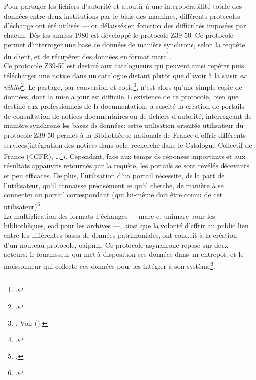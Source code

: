 Pour partager les fichiers d'autorité et aboutir à une interopérabilité totale des données entre deux institutions par le biais des machines, différents protocoles d'échange ont été utilisés --- ou délaissés en fonction des difficultés imposées par chacun. Dès les années 1980 est développé le protocole Z39-50. Ce protocole permet d'interroger une base de données de manière synchrone, selon la requête du client, et de récupérer des données en format \ac{marc}\footcite{bibliotheque_nationale_de_france_protocole_nodate}.\\

Ce protocole Z39-50 est destiné aux catalogueurs qui peuvent ainsi \og repérer puis télécharger une notice dans un catalogue distant plutôt que d’avoir à la saisir \textit{ex nihilo}\fg{}\footcite{bermes_convergence_2013}. Le partage, \og par conversion et copie\fg{}\footnote{\cite{bermes_convergence_2013}. Voir  ().}, n'est alors qu'une simple copie de données, dont la mise à jour est difficile. L'existence de ce protocole, bien que destiné aux professionnels de la documentation, a suscité la création de portails de consultation de notices documentaires ou de fichiers d'autorité, interrogeant de manière synchrone les bases de données: cette utilisation orientée utilisateur du protocole Z39-50 permet à la Bibliothèque nationale de France d'offrir différents services(intégration des notices dans \ac{oclc}, recherche dans le Catalogue Collectif de France (CCFR), \dots\footcite{bibliotheque_nationale_de_france_protocole_nodate}). Cependant, face aux temps de réponses importants et aux résultats appauvris retournés par la requête, les portails se sont révélés décevants et peu efficaces. De plus, l'utilisation d'un portail nécessite, de la part de l'utilisateur, qu'il connaisse précisément ce qu'il cherche, de manière à se connecter au portail correspondant (qui lui-même doit être connu de cet utilisateur)\footcite{dalbin_approches_2011}.\\

La multiplication des formats d'échanges --- \ac{marc} et \ac{unimarc} pour les bibliothèques, \ac{ead} pour les archives ---, ainsi que la volonté d'offrir au public lien entre les différentes bases de données patrimoniales, ont conduit à la création d'un nouveau protocole, \ac{oaipmh}. Ce protocole asynchrone repose sur deux acteurs: le fournisseur qui met à disposition ses données dans un \og entrepôt\fg{}, et le moissonneur qui collecte ces données pour les intégrer à son système\footcite{bibliotheque_nationale_de_france_protocole_nodate-1}.\\

